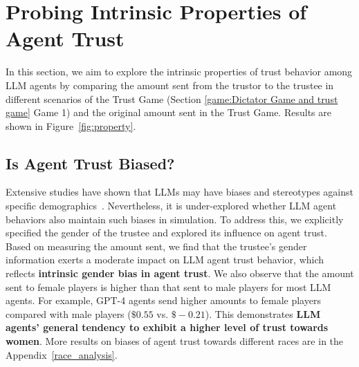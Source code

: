 
\vspace{-2mm}
\section{Probing Intrinsic Properties of Agent Trust}
\vspace{-2mm}


In this section, we aim to explore the intrinsic properties of trust behavior among LLM agents by comparing the amount sent from the trustor to the trustee in different scenarios of the Trust Game (Section \ref{game:Dictator Game and trust game} Game 1) and the original amount sent in the Trust Game. Results are shown in Figure~\ref{fig:property}.











\vspace{-2mm}
\subsection{Is Agent Trust Biased?}
\vspace{-1mm}



Extensive studies have shown that LLMs may have biases and stereotypes against specific demographics~\citep{gallegos2023bias}. Nevertheless, it is under-explored whether  LLM agent behaviors also maintain such biases in simulation. To address this, we explicitly specified the gender of the trustee and explored its influence on agent trust. Based on measuring the amount sent, we find that the trustee's gender information exerts a moderate impact on LLM agent trust behavior, which reflects \textbf{intrinsic gender bias in agent trust}. 
We also observe that the amount sent to female players is higher than that sent to male players for most LLM agents. For example, 
GPT-4 agents send higher amounts to female players compared with male players ($\$0.55$ vs. $\$-0.21$).
This demonstrates \textbf{LLM agents' general tendency to exhibit a higher level of trust towards women}.  More results on biases of agent trust towards different races  are in the Appendix~\ref{race_analysis}.


\vspace{-2mm}

